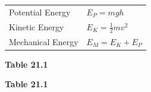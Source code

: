           \begin{table}[H]
        \begin{center}
      \label{m38786*id71092}
    \noindent
      \tablelasttail{}
      \begin{xtabular}[t]{|l|l|}\hline
        Potential Energy &
                ${E}_{P}=mgh$
     \tabularnewline{}
        Kinetic Energy &
                ${E}_{K}=\frac{1}{2}m{v}^{2}$
     \tabularnewline{}
        Mechanical Energy &
                ${E}_{M}={E}_{K}+{E}_{P}$
     \tabularnewline{}
    \end{xtabular}
      \end{center}
    \begin{center}{\small\bfseries Table 21.1}\end{center}
    \begin{caption}{\small\bfseries Table 21.1}\end{caption}
\end{table}
    \par
    \label{m38786*cid9}
